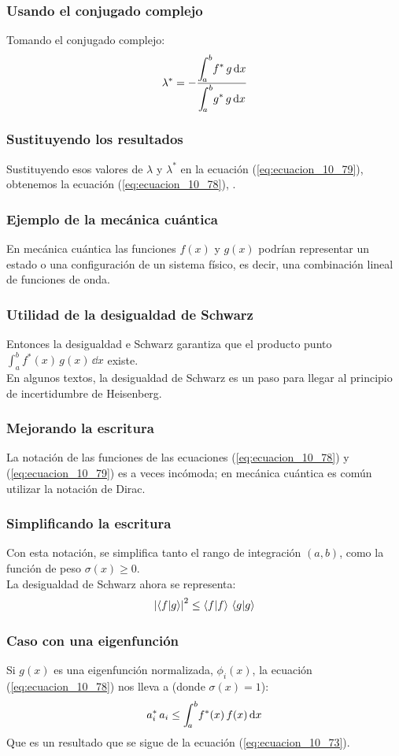 \documentclass[12pt]{beamer}
\begin{document}
\begin{frame}
\frametitle{Usando el conjugado complejo}
Tomando el conjugado complejo:
\pause
\begin{align}
\lambda^{*} = - \dfrac{\displaystyle \scaleint{5ex}_{\bs a}^{b} f^{*} \, g \dd{x}}{\displaystyle \scaleint{5ex}_{\bs a}^{b} g^{*} \, g \dd{x}}
\label{eq:ecuacion_80b}
\end{align}
\end{frame}
\begin{frame}
\frametitle{Sustituyendo los resultados}
Sustituyendo esos valores de $\lambda$ y $\lambda^{*}$ en la ecuación (\ref{eq:ecuacion_10_79}), \pause obtenemos la ecuación (\ref{eq:ecuacion_10_78}), \underline{}.
\end{frame}
\begin{frame}
\frametitle{Ejemplo de la mecánica cuántica}
En mecánica cuántica las funciones $f (x)$ y $g (x)$ podrían representar un estado o una configuración de un sistema físico, es decir, una combinación lineal de funciones de onda.
\end{frame}
\begin{frame}
\frametitle{Utilidad de la desigualdad de Schwarz}
Entonces la desigualdad e Schwarz garantiza que el producto punto $\displaystyle \int_{a}^{b} f^{*} (x) \, g(x) \, \dd{x}$ existe.
\\
\bigskip
\pause
En algunos textos, la desigualdad de Schwarz es un paso para llegar al principio de incertidumbre de Heisenberg.
\end{frame}
\begin{frame}
\frametitle{Mejorando la escritura}
La notación de las funciones de las ecuaciones (\ref{eq:ecuacion_10_78}) y (\ref{eq:ecuacion_10_79}) es a veces incómoda; \pause en mecánica cuántica es común utilizar la notación de Dirac.
\end{frame}
\begin{frame}
\frametitle{Simplificando la escritura}
Con esta notación, se simplifica tanto el rango de integración $(a, b)$, como la función de peso $\sigma (x) \geq 0$. 
\\
\bigskip
\pause
La desigualdad de Schwarz ahora se representa:
\pause
\begin{align}
\abs{\braket{f}{g}}^{2} \leq \braket{f}{f} \, \braket{g}{g}
\label{eq:ecuacion_10_78a}
\end{align}
\end{frame}
\begin{frame}
\frametitle{Caso con una eigenfunción}
Si $g (x)$ es una eigenfunción normalizada, $\phi_{i} (x)$, la ecuación (\ref{eq:ecuacion_10_78}) nos lleva a (donde $\sigma (x) = 1$):
\pause
\begin{align}
a_{i}^{*} \, a_{i} \leq \scaleint{5ex}_{\bs a}^{b} f^{*} (x) \, f (x) \dd{x} 
\label{eq:ecuacion_10_81}
\end{align}
Que es un resultado que se sigue de la ecuación (\ref{eq:ecuacion_10_73}).
\end{frame}
\end{document}
